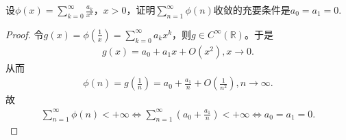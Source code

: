 \documentclass[../../main.tex]{subfiles}%
\begin{document}
\begin{example}
设\(\phi(x) = \sum_{k = 0}^{\infty} \frac{a_k}{x^k}\)，\(x > 0\)，证明\(\sum_{n = 1}^{\infty} \phi(n)\)收敛的充要条件是\(a_0 = a_1 = 0\).
\end{example}
\begin{proof}

令\(g\left( x \right) =\phi \left( \frac{1}{x} \right) =\sum_{k=0}^{\infty}{a_kx^k}\)，则\(g\in C^{\infty}\left( \mathbb{R} \right)\)。于是
\begin{align*}
g\left( x \right) =a_0+a_1x+O\left( x^2 \right) ,x\rightarrow 0.
\end{align*}
从而
\begin{align*}
\phi \left( n \right) =g\left( \frac{1}{n} \right) =a_0+\frac{a_1}{n}+O\left( \frac{1}{n^2} \right) ,n\rightarrow \infty .
\end{align*}
故
\begin{align*}
\sum_{n=1}^{\infty}{\phi \left( n \right)}<+\infty \Longleftrightarrow \sum_{n=1}^{\infty}{\left( a_0+\frac{a_1}{n} \right)}<+\infty \Longleftrightarrow a_0=a_1=0.
\end{align*}

\end{proof}
\end{document}
